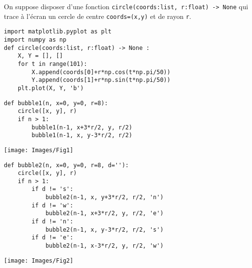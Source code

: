 
 On suppose disposer d’une fonction \texttt{circle(coords:list, r:float) -> None} qui trace à l’écran un cercle de centre 
 \texttt{coords=(x,y)} et de rayon \texttt{r}.
\ifprof\else
\begin{lstlisting}
import matplotlib.pyplot as plt
import numpy as np
def circle(coords:list, r:float) -> None :
    X, Y = [], []
    for t in range(101):
        X.append(coords[0]+r*np.cos(t*np.pi/50))
        Y.append(coords[1]+r*np.sin(t*np.pi/50))
    plt.plot(X, Y, 'b')
\end{lstlisting}
\fi

\begin{multicols}{2}
\ifprof
\begin{lstlisting}
def bubble1(n, x=0, y=0, r=8):
    circle([x, y], r)
    if n > 1:
        bubble1(n-1, x+3*r/2, y, r/2)
        bubble1(n-1, x, y-3*r/2, r/2)
\end{lstlisting}
\else
\begin{center}
\texttt{[image: Images/Fig1]}
\end{center}
\fi
{}
\ifprof
\begin{lstlisting}
def bubble2(n, x=0, y=0, r=8, d=''):
    circle([x, y], r)
    if n > 1:
        if d != 's':
            bubble2(n-1, x, y+3*r/2, r/2, 'n')
        if d != 'w':
            bubble2(n-1, x+3*r/2, y, r/2, 'e')
        if d != 'n':
            bubble2(n-1, x, y-3*r/2, r/2, 's')
        if d != 'e':
            bubble2(n-1, x-3*r/2, y, r/2, 'w')
\end{lstlisting}
\else
\begin{center}
\texttt{[image: Images/Fig2]}
\end{center}
\fi
\end{multicols}